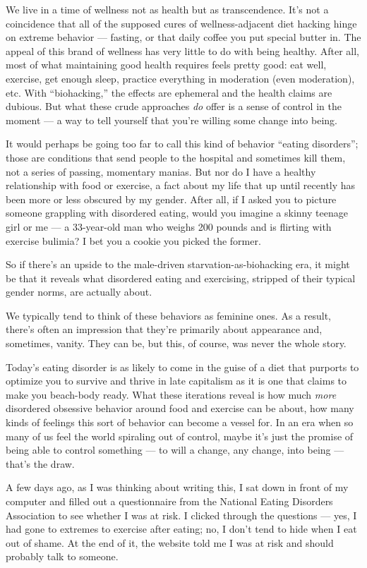 We live in a time of wellness not as health but as transcendence. It's
not a coincidence that all of the supposed cures of wellness-adjacent
diet hacking hinge on extreme behavior --- fasting, or that daily coffee
you put special butter in. The appeal of this brand of wellness has very
little to do with being healthy. After all, most of what maintaining
good health requires feels pretty good: eat well, exercise, get enough
sleep, practice everything in moderation (even moderation), etc. With
``biohacking,'' the effects are ephemeral and the health claims are
dubious. But what these crude approaches \emph{do} offer is a sense of
control in the moment --- a way to tell yourself that you're willing
some change into being.

It would perhaps be going too far to call this kind of behavior ``eating
disorders''; those are conditions that send people to the hospital and
sometimes kill them, not a series of passing, momentary manias. But nor
do I have a healthy relationship with food or exercise, a fact about my
life that up until recently has been more or less obscured by my gender.
After all, if I asked you to picture someone grappling with disordered
eating, would you imagine a skinny teenage girl or me --- a 33-year-old
man who weighs 200 pounds and is flirting with exercise bulimia? I bet
you a cookie you picked the former.

So if there's an upside to the male-driven starvation-as-biohacking era,
it might be that it reveals what disordered eating and exercising,
stripped of their typical gender norms, are actually about.

We typically tend to think of these behaviors as feminine ones. As a
result, there's often an impression that they're primarily about
appearance and, sometimes, vanity. They can be, but this, of course, was
never the whole story.

Today's eating disorder is as likely to come in the guise of a diet that
purports to optimize you to survive and thrive in late capitalism as it
is one that claims to make you beach-body ready. What these iterations
reveal is how much \emph{more} disordered obsessive behavior around food
and exercise can be about, how many kinds of feelings this sort of
behavior can become a vessel for. In an era when so many of us feel the
world spiraling out of control, maybe it's just the promise of being
able to control something --- to will a change, any change, into being
--- that's the draw.

A few days ago, as I was thinking about writing this, I sat down in
front of my computer and filled out a questionnaire from the National
Eating Disorders Association to see whether I was at risk. I clicked
through the questions --- yes, I had gone to extremes to exercise after
eating; no, I don't tend to hide when I eat out of shame. At the end of
it, the website told me I was at risk and should probably talk to
someone.

